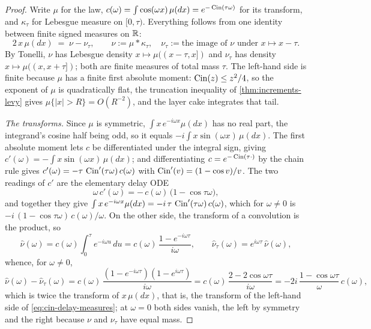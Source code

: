 \begin{proof}
\leanok
Write $\mu$ for the law, $c(\omega) = \int\cos(\omega x)\,\mu(dx) = e^{-\operatorname{Cin}(\tau\omega)}$ for
its transform, and $\kappa_\tau$ for Lebesgue measure on $[0,\tau)$. Everything follows from one
identity between finite signed measures on $\mathbb{R}$:
\begin{equation}\label{eq:cin-delay-measures}
  2\,x\,\mu(dx) \;=\; \nu - \nu_\tau ,
  \qquad \nu := \mu * \kappa_\tau, \quad
  \nu_\tau := \text{the image of $\nu$ under } x \mapsto x - \tau .
\end{equation}
By Tonelli, $\nu$ has Lebesgue density $x \mapsto \mu((x-\tau,x])$ and $\nu_\tau$ has density
$x \mapsto \mu((x,x+\tau])$; both are finite measures of total mass $\tau$. The left-hand side
is finite because $\mu$ has a finite first absolute moment: $\operatorname{Cin}(z) \le z^2/4$, so the exponent
of $\mu$ is quadratically flat, the truncation inequality of \ref{thm:increments-levy} gives
$\mu\{|x| > R\} = O(R^{-2})$, and the layer cake integrates that tail.

\emph{The transforms.} Since $\mu$ is symmetric, $\int x\,e^{-i\omega x}\mu(dx)$ has no real
part, the integrand's cosine half being odd, so it equals $-i\int x\sin(\omega x)\,\mu(dx)$. The
first absolute moment lets $c$ be differentiated under the integral sign, giving
$c'(\omega) = -\int x\sin(\omega x)\,\mu(dx)$; and differentiating $c = e^{-\operatorname{Cin}(\tau\cdot)}$ by
the chain rule gives $c'(\omega) = -\tau\,\operatorname{Cin}'(\tau\omega)\,c(\omega)$ with
$\operatorname{Cin}'(v) = (1-\cos v)/v$. The two readings of $c'$ are the elementary delay ODE
\begin{equation}\label{eq:cin-delay-ode}
  \omega\,c'(\omega) = -\,c(\omega)\,\bigl(1 - \cos\tau\omega\bigr),
\end{equation}
and together they give
$\int x\,e^{-i\omega x}\mu(dx) = -i\,\tau\,\operatorname{Cin}'(\tau\omega)\,c(\omega)$, which for
$\omega \ne 0$ is $-i\,(1-\cos\tau\omega)\,c(\omega)/\omega$. On the other side, the transform of
a convolution is the product, so
\[
  \hat\nu(\omega) = c(\omega)\int_0^\tau e^{-i\omega u}\,du
    = c(\omega)\,\frac{1 - e^{-i\omega\tau}}{i\omega},
  \qquad \hat\nu_\tau(\omega) = e^{i\omega\tau}\,\hat\nu(\omega),
\]
whence, for $\omega \ne 0$,
\[
  \hat\nu(\omega) - \hat\nu_\tau(\omega)
    = c(\omega)\,\frac{(1 - e^{-i\omega\tau})(1 - e^{i\omega\tau})}{i\omega}
    = c(\omega)\,\frac{2 - 2\cos\omega\tau}{i\omega}
    = -2i\,\frac{1 - \cos\omega\tau}{\omega}\,c(\omega),
\]
which is twice the transform of $x\,\mu(dx)$, that is, the transform of the left-hand side of \ref{eq:cin-delay-measures}; at $\omega = 0$ both
sides vanish, the left by symmetry and the right because $\nu$ and $\nu_\tau$ have equal mass.


\end{proof}
